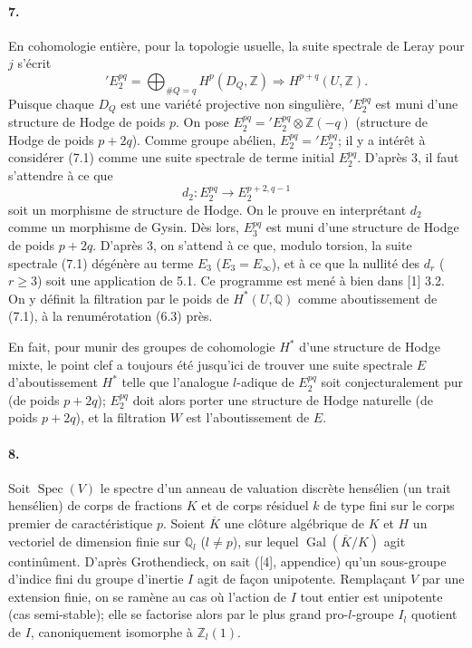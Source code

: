 \documentclass[10pt]{article}
\newcommand{\Q}{\mathbb Q}
\newcommand{\Z}{\mathbb Z}
\newcommand{\Gal}{\operatorname{Gal}}
\newcommand{\Spec}{\operatorname{Spec}}
\newcommand{\barK}{\overline{K}}
\begin{document}
\paragraph{7.} En cohomologie entière, pour la topologie usuelle, la suite spectrale de Leray pour $j$ s'écrit
\[
\tag{7.1}
{}'E_2^{pq}=\bigoplus_{\#Q=q}H^p(D_Q,\Z)\Rightarrow H^{p+q}(U,\Z).
\]
Puisque chaque $D_Q$ est une variété projective non singulière, ${}'E_2^{pq}$ est muni d'une structure de Hodge de poids $p$. On pose $E_2^{pq}={}'E_2^{pq}\otimes\Z(-q)$ (structure de Hodge de poids $p+2q$). Comme groupe abélien, $E_2^{pq}={}'E_2^{pq}$; il y a intérêt à considérer (7.1) comme une suite spectrale de terme initial $E_2^{pq}$. D'après 3, il faut s'attendre à ce que
\[
d_2:E_2^{pq}\to E_2^{p+2,q-1}
\]
soit un morphisme de structure de Hodge. On le prouve en interprétant $d_2$ comme un morphisme de Gysin. Dès lors, $E_3^{pq}$ est muni d'une structure de Hodge de poids $p+2q$. D'après 3, on s'attend à ce que, modulo torsion, la suite spectrale (7.1) %
dégénère au terme $E_3$ ($E_3=E_\infty$), et à ce que la nullité des $d_r$ ($r\ge3$) soit une application de 5.1. Ce programme est mené à bien dans [1] 3.2. On y définit la filtration par le poids de $H^*(U,\Q)$ comme aboutissement de (7.1), à la renumérotation (6.3) près.

En fait, pour munir des groupes de cohomologie $H^*$ d'une structure de Hodge mixte, le point clef a toujours été jusqu'ici de trouver une suite spectrale $E$ d'aboutissement $H^*$ telle que l'analogue $l$-adique de $E_2^{pq}$ soit conjecturalement pur (de poids $p+2q$); $E_2^{pq}$ doit alors porter une structure de Hodge naturelle (de poids $p+2q$), et la filtration $W$ est l'aboutissement de $E$.

\paragraph{8.} Soit $\Spec(V)$ le spectre d'un anneau de valuation discrète hensélien (un trait hensélien) de corps de fractions $K$ et de corps résiduel $k$ de type fini sur le corps premier de caractéristique $p$. Soient $\barK$ une clôture algébrique de $K$ et $H$ un vectoriel de dimension finie sur $\Q_l$ ($l\ne p$), sur lequel $\Gal(\barK/K)$ agit continûment. D'après Grothendieck, on sait ([4], appendice) qu'un sous-groupe d'indice fini du groupe d'inertie $I$ agit de façon unipotente. Remplaçant $V$ par une extension finie, on se ramène au cas où l'action de $I$ tout entier est unipotente (cas semi-stable); elle se factorise alors par le plus grand pro-$l$-groupe $I_l$ quotient de $I$, canoniquement isomorphe à $\Z_l(1)$. %
\end{document}
